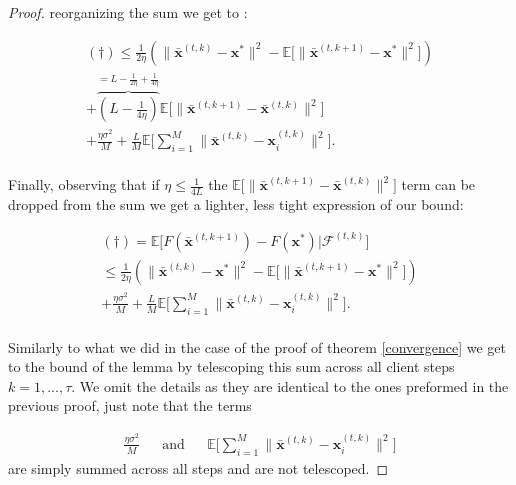 \begin{proof}
reorganizing the sum we get to :

\begin{align*}
    (\dagger) \leq
     \frac{1}{2\eta} 
   \left(  \|  \bar{\bm{x}}^{(t,k)} - \bm{x}^{*} \|^2 - \mathbb{E} \Big[ \| \bar{\bm{x}}^{(t,k+1)} - \bm{x}^{*} \|^2  \Big]   \right)
    \\
    + \overbrace{\left( L -  \frac{1}{4\eta}  \right)}^{=L -  \frac{1}{2\eta} + \frac{1}{4\eta} } \mathbb{E} \Bigg[ \|  \bar{\bm{x}}^{(t,k+1)} - \bar{\bm{x}}^{(t,k)} \|^2 \Bigg] \\
    + \frac{\eta \sigma^2}{M} 
    + \frac{L}{M}  \mathbb{E} \Bigg[ \sum_{i=1}^M \|\bar{\bm{x}}^{(t,k)}-\bm{x}_i^{(t,k)} \|^2 \Bigg]. \\
\end{align*}

Finally, observing that if $\eta \leq \frac{1}{4L}$ the $ \mathbb{E} \Bigg[ \|  \bar{\bm{x}}^{(t,k+1)} - \bar{\bm{x}}^{(t,k)} \|^2 \Bigg] $ term can be dropped from the sum we get a lighter, less tight expression of our bound:


\begin{align*}
    (\dagger) = \mathbb{E} \Big[ F(\bar{\bm{x}}^{(t,k+1)}) - F(\bm{x}^*) | \mathcal{F}^{(t,k)}\Big] \\ \leq
     \frac{1}{2\eta} 
   \left(  \|  \bar{\bm{x}}^{(t,k)} - \bm{x}^{*} \|^2 - \mathbb{E} \Big[ \| \bar{\bm{x}}^{(t,k+1)} - \bm{x}^{*} \|^2  \Big]   \right)
    \\
    + \frac{\eta \sigma^2}{M} 
    + \frac{L}{M}  \mathbb{E} \Bigg[ \sum_{i=1}^M \|\bar{\bm{x}}^{(t,k)}-\bm{x}_i^{(t,k)} \|^2 \Bigg]. \\
\end{align*}

Similarly to what we did in the case of the proof of theorem \ref{convergence} we get to the bound of the lemma by telescoping this sum across all client steps $k=1,...,\tau$. We omit the details as they are identical to the ones preformed in the previous proof, just note that the terms 

\begin{align*}
    \frac{\eta \sigma^2}{M} &&\text{and}&& \mathbb{E} \Bigg[ \sum_{i=1}^M \|\bar{\bm{x}}^{(t,k)}-\bm{x}_i^{(t,k)} \|^2 \Bigg]
\end{align*}
are simply summed across all steps and are not telescoped.
\end{proof}

